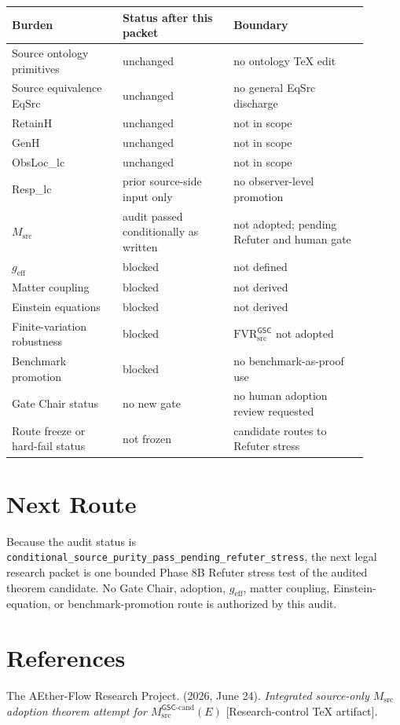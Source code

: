 \documentclass[11pt]{article}
\newcommand{\Msrc}{M_{\mathrm{src}}}
\newcommand{\FVR}{\mathrm{FVR}_{\mathrm{src}}^{\mathsf{GSC}}}
\begin{document}
\begin{longtable}{p{0.28\linewidth}p{0.28\linewidth}p{0.34\linewidth}}
\toprule
Burden & Status after this packet & Boundary \\
\midrule
Source ontology primitives & unchanged & no ontology TeX edit \\
Source equivalence EqSrc & unchanged & no general EqSrc discharge \\
RetainH & unchanged & not in scope \\
GenH & unchanged & not in scope \\
ObsLoc\_lc & unchanged & not in scope \\
Resp\_lc & prior source-side input only & no observer-level promotion \\
\(\Msrc\) & audit passed conditionally as written & not adopted; pending Refuter and human gate \\
\(g_{\mathrm{eff}}\) & blocked & not defined \\
Matter coupling & blocked & not derived \\
Einstein equations & blocked & not derived \\
Finite-variation robustness & blocked & \(\FVR\) not adopted \\
Benchmark promotion & blocked & no benchmark-as-proof use \\
Gate Chair status & no new gate & no human adoption review requested \\
Route freeze or hard-fail status & not frozen & candidate routes to Refuter stress \\
\bottomrule
\end{longtable}

\section{Next Route}

Because the audit status is
\texttt{conditional\_source\_purity\_pass\_pending\_refuter\_stress}, the next
legal research packet is one bounded Phase 8B Refuter stress test of the
audited theorem candidate. No Gate Chair, adoption, \(g_{\mathrm{eff}}\),
matter coupling, Einstein-equation, or benchmark-promotion route is authorized
by this audit.

\section*{References}

The AEther-Flow Research Project. (2026, June 24). \textit{Integrated
source-only \(M_{\mathrm{src}}\) adoption theorem attempt for
\(M_{\mathrm{src}}^{\mathsf{GSC}\mbox{-}\mathrm{cand}}(E)\)}
[Research-control TeX artifact].
\end{document}
